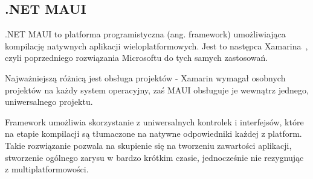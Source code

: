 \subsection{.NET MAUI} \label{mauiFrameworkSubsection}
.NET MAUI \cite{mauiDefinition} to platforma programistyczna (ang. framework) umożliwiająca
kompilację natywnych aplikacji wieloplatformowych. Jest to następca Xamarina~\cite{xamarin},
czyli poprzedniego rozwiązania Microsoftu do tych samych zastosowań.

Najważniejszą różnicą jest obsługa projektów - Xamarin wymagał osobnych projektów na każdy system operacyjny, 
zaś MAUI obsługuje je wewnątrz jednego, uniwersalnego projektu.

Framework umożliwia skorzystanie z uniwersalnych kontrolek i interfejsów, 
które na etapie kompilacji są tłumaczone na natywne odpowiedniki każdej z platform. 
Takie rozwiązanie pozwala na skupienie się na tworzeniu zawartości aplikacji,
stworzenie ogólnego zarysu w bardzo krótkim czasie, jednocześnie nie rezygnując z multiplatformowości.